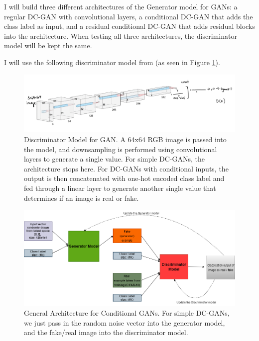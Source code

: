 \documentclass[twoside,11pt]{article}
\begin{document}
I will build three different architectures of the Generator model for GANs: a regular DC-GAN with convolutional layers, a conditional DC-GAN that adds the class label as input, and a residual conditional DC-GAN that adds residual blocks into the architecture. When testing all three architectures, the discriminator model will be kept the same. 

I will use the following discriminator model from \citet{radford:16} (as seen in Figure \ref{fig:discriminator}).

\begin{figure}[h!]
  \centering
  \includegraphics[width=\textwidth]{images/discriminator.png}
  \caption{Discriminator Model for GAN. A 64x64 RGB image is passed into the model, and downsampling is performed using convolutional layers to generate a single value. For simple DC-GANs, the architecture stops here. For DC-GANs with conditional inputs, the output is then concatenated with one-hot encoded class label and fed through a linear layer to generate another single value that determines if an image is real or fake.}
  \label{fig:discriminator}
\end{figure}

\begin{figure}[h!]
  \centering
  \includegraphics[width=\textwidth]{images/gan.png}
  \caption{General Architecture for Conditional GANs. For simple DC-GANs, we just pass in the random noise vector into the generator model, and the fake/real image into the discriminator model.}
  \label{fig:dcgan-3}
\end{figure}
\end{document}
